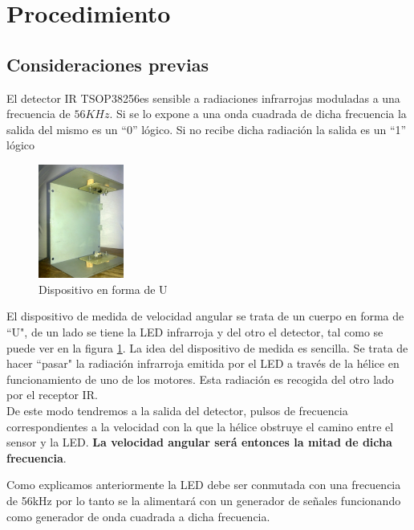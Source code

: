 \documentclass[main]{subfiles}
\begin{document}
\section{Procedimiento}


\subsection{Consideraciones previas}

El detector IR TSOP38256es sensible a radiaciones infrarrojas moduladas a una frecuencia de $56KHz$. Si se lo expone a una onda cuadrada de dicha frecuencia la salida del mismo es un ``0'' l\'ogico. Si no recibe dicha radiaci\'on la salida es un ``1'' l\'ogico\\
\begin{figure}
  \begin{center}
    \includegraphics[width=0.25\textwidth]{./pics_motores/u.jpg}
  \end{center}
  \caption{Dispositivo en forma de U}
  \label{fig:u}
\end{figure}
El dispositivo de medida de velocidad angular se trata de un cuerpo en forma de ``U", de un lado se tiene la LED infrarroja y del otro el detector, tal como se puede ver en la figura \ref{fig:u}.
La idea del dispositivo de medida es sencilla. Se trata de hacer ``pasar" la radiaci\'on infrarroja emitida por el LED a trav\'es de la h\'elice en funcionamiento de uno de los motores. Esta radiaci\'on es recogida del otro lado por el receptor IR.\\

De este modo tendremos a la salida del detector, pulsos de frecuencia correspondientes a la velocidad con la que la h\'elice obstruye el camino entre el sensor y la LED. \textbf{La velocidad angular ser\'a entonces la mitad de dicha frecuencia}.




Como explicamos anteriormente la LED debe ser conmutada con una frecuencia de 56kHz por lo tanto se la alimentar\'a con un generador de se\~nales funcionando como generador de onda cuadrada a dicha frecuencia.\\ 
\end{document}

